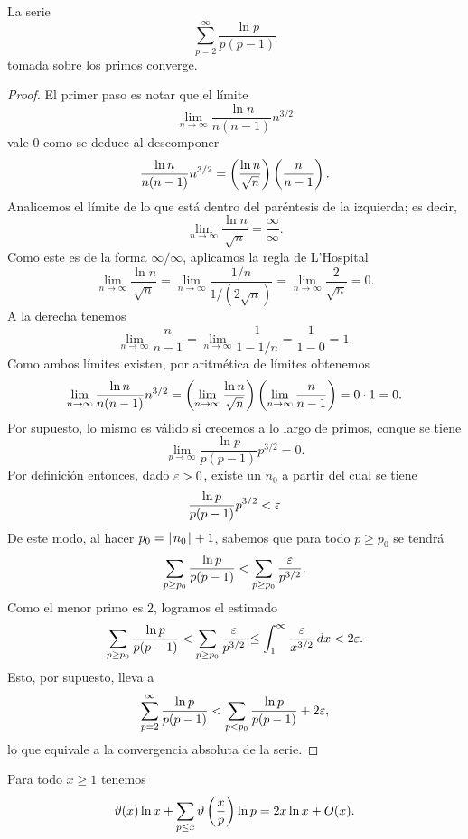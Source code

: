 \begin{lemma}
  \label{lem:sum-lnp}
  La serie
  \[
    \sum_{p = 2}^{\infty} \frac{\ln p}{p (p - 1)}
  \]
  tomada sobre los primos converge.
\end{lemma}

\begin{proof}
  El primer paso es notar que el l\'imite
  \[
    \lim_{n \to \infty} \frac{\ln n}{n (n - 1)} n^{3/2}
  \]
  vale \(0\) como se deduce al descomponer 
  \[
    \frac{\ln n}{n (n - 1)} n^{3/2}
    = \left( \frac{\ln n}{\sqrt{n}} \right)\left( \frac{n}{n - 1} \right).
  \]
  Analicemos el l\'imite de lo que est\'a dentro del par\'entesis de la izquierda; es decir,
  \[
    \lim_{n \to \infty} \frac{\ln n}{\sqrt{n}} = \frac{\infty}{\infty}.
  \]
  Como este es de la forma \(\infty / \infty\), aplicamos la regla de L'Hospital
  \[
    \lim_{n \to \infty} \frac{\ln n}{\sqrt{n}}
    = \lim_{n \to \infty}\frac{1/n}{1/(2\sqrt{n})}
    = \lim_{n \to \infty} \frac{2}{\sqrt{n}} = 0.
  \]
  A la derecha tenemos
  \[
    \lim_{n \to \infty} \frac{n}{n - 1}
    = \lim_{n \to \infty} \frac{1}{1 - 1/n}
    = \frac{1}{1 - 0} = 1.
  \]
  Como ambos l\'imites existen, por aritm\'etica de l\'imites obtenemos
  \[
    \lim_{n \to \infty} \frac{\ln n}{n (n - 1)} n^{3/2}
    = \left( \lim_{n \to \infty} \frac{\ln n}{\sqrt{n}} \right)
    \left( \lim_{n \to \infty} \frac{n}{n - 1} \right)
    = 0 \cdot 1
    = 0.
  \]
  Por supuesto, lo mismo es v\'alido si crecemos a lo largo de primos, conque se tiene 
  \[
    \lim_{p \to \infty} \frac{\ln p}{p (p - 1)} p^{3/2}=0.
  \]
  Por definici\'on entonces, dado \(\varepsilon > 0\), existe un \(n_0\) a partir del cual se tiene
  \[
    \frac{\ln p}{p (p - 1)} p^{3/2} < \varepsilon
  \]
  De este modo, al hacer \(p_0 = \left\lfloor n_0 \right\rfloor + 1\),
  sabemos que para todo \(p \geq p_0\) se tendr\'a 
  \[
    \sum_{p \geq p_0} \frac{\ln p}{p (p - 1)}
    < \sum_{p \geq p_0} \frac{\varepsilon}{p^{3/2}}.
  \]
  Como el menor primo es \(2\), logramos el estimado
  \[
    \sum_{p \geq p_0} \frac{\ln p}{p (p - 1)}
    < \sum_{p \geq p_0} \frac{\varepsilon}{p^{3/2}}
    \le \int_{1}^\infty \frac{\varepsilon}{x^{3/2}} \, dx
    < 2 \varepsilon.
  \]
  Esto, por supuesto, lleva a
  \[
    \sum_{p = 2}^\infty \frac{\ln p}{p (p - 1)}
    < \sum_{p < p_0} \frac{\ln p}{p (p - 1)} + 2 \varepsilon,
  \]
  lo que equivale a la convergencia absoluta de la serie.
\end{proof}

\begin{lemma}
  \label{lem:theta-2xlnx-ox}
  Para todo \(x \geq 1\) tenemos
  \[
    \vartheta(x)\ln x
    + \sum_{p \leq x} \vartheta\left( \frac{x}{p} \right)\ln p
    = 2x\ln x + O(x).
  \]
\end{lemma}

